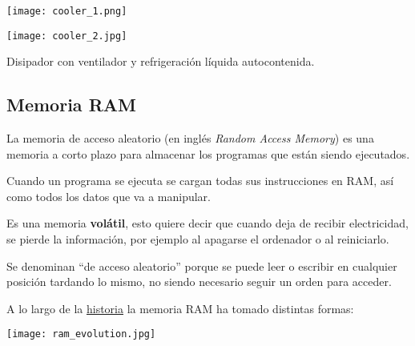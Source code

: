 {
\hfill
\begin{minipage}{0.3\linewidth}
    \texttt{[image: cooler\_1.png]}
\end{minipage}
\hfill
\begin{minipage}{0.5\linewidth}
    \texttt{[image: cooler\_2.jpg]}
\end{minipage}
\hfill

\vspace{-20pt}
\begin{center}
    {\footnotesize Disipador con ventilador y refrigeración líquida autocontenida.}
\end{center}
}


\subsection{Memoria RAM}

\begin{minipage}{0.6\linewidth}
\setlength{\parskip}{1.2em}
La memoria de acceso aleatorio (en inglés \textit{Random Access Memory}) es una memoria a corto plazo para almacenar los programas que están siendo ejecutados.

Cuando un programa se ejecuta se cargan todas sus instrucciones en RAM, así como todos los datos que va a manipular.

Es una memoria \textbf{volátil}, esto quiere decir que cuando deja de recibir electricidad, se pierde la información, por ejemplo al apagarse el ordenador o al reiniciarlo.

Se denominan “de acceso aleatorio” porque se puede leer o escribir en cualquier posición tardando lo mismo, no siendo necesario seguir un orden para acceder.

A lo largo de la \href{https://es.wikipedia.org/wiki/Memoria_de_acceso_aleatorio\#M%C3%B3dulos_de_RAM}{historia} la memoria RAM ha tomado distintas formas:
\end{minipage}
\hfill
\begin{minipage}{0.35\linewidth}
    \texttt{[image: ram\_evolution.jpg]}
    \vspace{-30pt}
\end{minipage}

